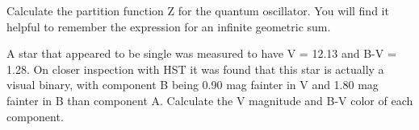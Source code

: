 \documentclass[12pt]{article}
\newenvironment{problem}[2][Problem]{\begin{trivlist}
\item[\hskip \labelsep {\bfseries #1}\hskip \labelsep {\bfseries #2.}]}{\end{trivlist}}
\newenvironment{answer}[2][Answer]{\begin{trivlist}
\item[\hskip \labelsep {\bfseries #1}\hskip \labelsep {\bfseries #2.}]}{\end{trivlist}}
\begin{document}
\bigskip
\bigskip

\begin{problem}{1b}
  Calculate the partition function Z for the quantum oscillator. You will find it
  helpful to remember the expression for an infinite geometric sum.
\end{problem}

\begin{answer}{1}



\end{answer}

\bigskip
\bigskip



\begin{problem}{2}
A star that appeared to be single was measured to have V = 12.13 and B-V = 1.28. On closer inspection with HST it was found that this star is actually a visual binary, with component B being 0.90 mag fainter in V and 1.80 mag fainter in B than component A. Calculate the V magnitude and B-V color of each component.
\end{problem}
\end{document}
